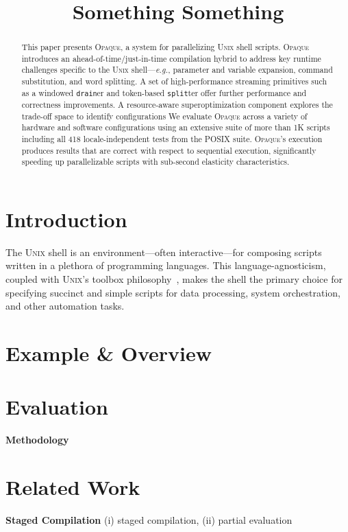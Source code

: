 \documentclass[sigplan, screen, review, anonymous]{acmart}
\newcommand{\eg}{{\em e.g.}, }
\newcommand{\heading}[1]{\vspace{4pt}\noindent\textbf{#1}\enspace}
\newcommand{\ttt}[1]{\texttt{#1}}
\newcommand{\unix}{{\scshape Unix}\xspace}
\newcommand{\sys}{{\scshape Opaque}\xspace}
\begin{document}
\title{Something Something}

\begin{abstract}
This paper presents \sys, a system for parallelizing \unix shell scripts. 
\sys introduces an ahead-of-time/just-in-time compilation hybrid to address key runtime challenges specific to the \unix shell---\eg parameter and variable expansion, command substitution, and word splitting.
A set of high-performance streaming primitives such as a windowed \ttt{drain}er and token-based \ttt{split}ter offer further  performance and correctness improvements.
A resource-aware superoptimization component explores the trade-off space to identify configurations 
We evaluate \sys across a variety of hardware and software configurations using an extensive suite of more than 1K scripts including all 418 locale-independent tests from the POSIX suite.
\sys's execution produces results that are correct with respect to sequential execution, significantly speeding up parallelizable scripts with sub-second elasticity characteristics. %
\end{abstract}

\maketitle

\section{Introduction}
\label{intro}

The \unix shell is an environment---often interactive---for composing scripts written in a plethora of programming languages.
This language-agnosticism, coupled with \unix's toolbox philosophy~\cite{mcilroy1978unix}, makes the shell the primary choice for specifying succinct and simple scripts for data processing, system orchestration, and other automation tasks.

\section{Example \& Overview}
\label{overview}

\section{Evaluation}
\label{eval}

\heading{Methodology}

\section{Related Work}

\heading{Staged Compilation}
(i) staged compilation, (ii) partial evaluation
 


{\small
  
}
\end{document}
